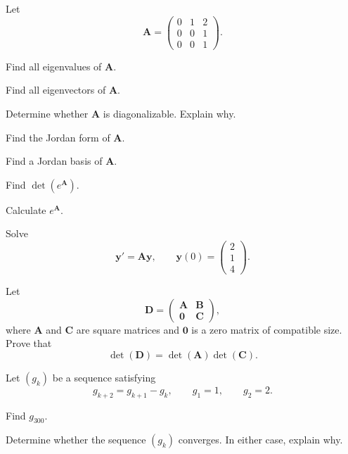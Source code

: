\documentclass[11pt,oneside]{article}
\begin{document}
\begin{problem}
Let
\[
\mathbf A=
\begin{pmatrix}
0&1&2\\
0&0&1\\
0&0&1
\end{pmatrix}.
\]
\begin{problemsubparts}
\item Find all eigenvalues of $\mathbf A$.
\item Find all eigenvectors of $\mathbf A$.
\item Determine whether $\mathbf A$ is diagonalizable. Explain why.
\item Find the Jordan form of $\mathbf A$.
\item Find a Jordan basis of $\mathbf A$.
\item Find $\det(e^{\mathbf A})$.
\item Calculate $e^{\mathbf A}$.
\item Solve
\[
\mathbf y'=\mathbf A\mathbf y,
\qquad
\mathbf y(0)=
\begin{pmatrix}
2\\1\\4
\end{pmatrix}.
\]
\end{problemsubparts}
\end{problem}

\begin{problem}
Let
\[
\mathbf D=
\begin{pmatrix}
\mathbf A&\mathbf B\\
\mathbf 0&\mathbf C
\end{pmatrix},
\]
where $\mathbf A$ and $\mathbf C$ are square matrices and $\mathbf 0$ is a zero matrix of compatible size. Prove that
\[
\det(\mathbf D)=\det(\mathbf A)\det(\mathbf C).
\]
\end{problem}

\begin{problem}
Let $(g_k)$ be a sequence satisfying
\[
g_{k+2}=g_{k+1}-g_k,
\qquad
g_1=1,
\qquad
g_2=2.
\]
\begin{problemsubparts}
\item Find $g_{300}$.
\item Determine whether the sequence $(g_k)$ converges. In either case, explain why.
\end{problemsubparts}
\end{problem}
\end{document}
